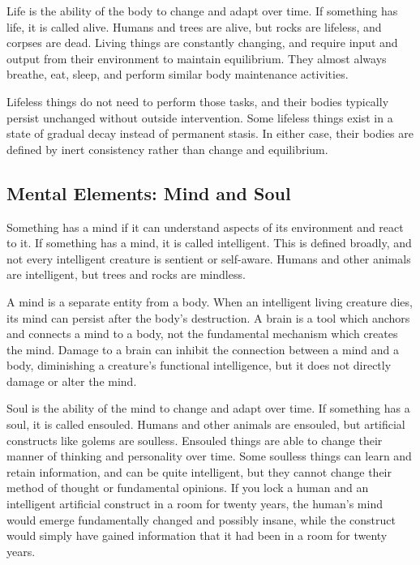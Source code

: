         Life is the ability of the body to change and adapt over time.
        If something has life, it is called alive.
        Humans and trees are alive, but rocks are lifeless, and corpses are dead.
        Living things are constantly changing, and require input and output from their environment to maintain equilibrium.
        They almost always breathe, eat, sleep, and perform similar body maintenance activities.

        Lifeless things do not need to perform those tasks, and their bodies typically persist unchanged without outside intervention.
        Some lifeless things exist in a state of gradual decay instead of permanent stasis.
        In either case, their bodies are defined by inert consistency rather than change and equilibrium.

    \subsection{Mental Elements: Mind and Soul}
        Something has a mind if it can understand aspects of its environment and react to it.
        If something has a mind, it is called intelligent.
        This is defined broadly, and not every intelligent creature is sentient or self-aware.
        Humans and other animals are intelligent, but trees and rocks are mindless.

        A mind is a separate entity from a body.
        When an intelligent living creature dies, its mind can persist after the body's destruction.
        A brain is a tool which anchors and connects a mind to a body, not the fundamental mechanism which creates the mind.
        Damage to a brain can inhibit the connection between a mind and a body, diminishing a creature's functional intelligence, but it does not directly damage or alter the mind.

        Soul is the ability of the mind to change and adapt over time.
        If something has a soul, it is called ensouled.
        Humans and other animals are ensouled, but artificial constructs like golems are soulless.
        Ensouled things are able to change their manner of thinking and personality over time.
        Some soulless things can learn and retain information, and can be quite intelligent, but they cannot change their method of thought or fundamental opinions.
        If you lock a human and an intelligent artificial construct in a room for twenty years, the human's mind would emerge fundamentally changed and possibly insane, while the construct would simply have gained information that it had been in a room for twenty years.

